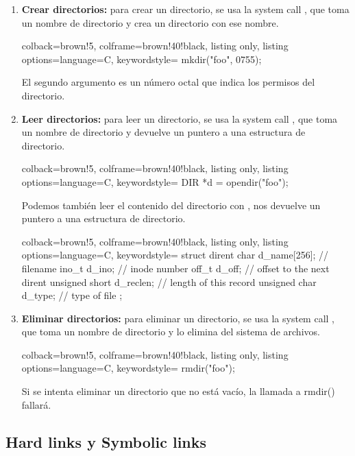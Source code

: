 \documentclass[openany]{book}
\begin{document}
\begin{enumerate}
    \item \textbf{Crear directorios:} para crear un directorio, se usa la system call , que toma un nombre de directorio y crea un directorio con ese nombre.
    \begin{tcblisting}{colback=brown!5, colframe=brown!40!black, listing only, listing options={language=C, keywordstyle=\color{blue!35!white}\bfseries}}
    mkdir("foo", 0755);
    \end{tcblisting}
    El segundo argumento es un número octal que indica los permisos del directorio.
    \item \textbf{Leer directorios:} para leer un directorio, se usa la system call , que toma un nombre de directorio y devuelve un puntero a una estructura de directorio.
    \begin{tcblisting}{colback=brown!5, colframe=brown!40!black, listing only, listing options={language=C, keywordstyle=\color{blue!35!white}\bfseries}}
    DIR *d = opendir("foo");
    \end{tcblisting}
    Podemos también leer el contenido del directorio con , nos devuelve un puntero a una estructura de directorio.
    \begin{tcblisting}{colback=brown!5, colframe=brown!40!black, listing only, listing options={language=C, keywordstyle=\color{blue!35!white}\bfseries}}
    struct dirent {
        char d_name[256]; // filename
        ino_t d_ino; // inode number
        off_t d_off; // offset to the next dirent
        unsigned short d_reclen; // length of this record
        unsigned char d_type; // type of file
    };
    \end{tcblisting}
    \item \textbf{Eliminar directorios:} para eliminar un directorio, se usa la system call , que toma un nombre de directorio y lo elimina del sistema de archivos.
    \begin{tcblisting}{colback=brown!5, colframe=brown!40!black, listing only, listing options={language=C, keywordstyle=\color{blue!35!white}\bfseries}}
    rmdir("foo");
    \end{tcblisting}
    Si se intenta eliminar un directorio que no está vacío, la llamada a rmdir() fallará.
\end{enumerate}

\subsection{Hard links y Symbolic links}
\end{document}
